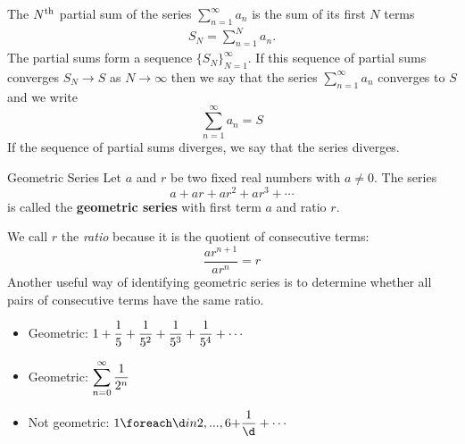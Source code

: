 \begin{frame}[t]
\begin{defn}
The $N^{\rm th}$ partial sum of the series $\sum_{n=1}^\infty a_n$ is the sum of its first $N$ terms
\begin{align*}
S_N=\sum_{n=1}^N a_n.
\end{align*}
The partial sums form a sequence $\big\{S_N\big\}_{N=1}^\infty$.
If this sequence of partial sums converges $S_N \to S$ as
$N\rightarrow\infty$  then we say that the series $\sum_{n=1}^\infty a_n$
converges to $S$ and we write
\begin{equation*}
\sum_{n=1}^\infty a_n=S
\end{equation*}
If the sequence of partial sums diverges, we say that the series diverges.
\end{defn}
\end{frame}
\begin{frame}[t]
\begin{block}{Geometric Series}
Let $a$ and $r$ be two fixed real numbers with $a \neq 0$. The series 
\[a+ar+ar^2+ar^3+\cdots\]
is called the \textbf{geometric series} with first term $a$ and ratio $r$.
\end{block}
We call $r$ the \textit{ratio} because it is the quotient of consecutive terms:
\[\frac{ar^{n+1}}{ar^n}=r\]\pause
Another useful way of identifying geometric series is to determine whether all pairs of consecutive terms have the same ratio.

\begin{itemize}
\item  Geometric: $\displaystyle 1+\frac15+\frac{1}{5^2}+\frac{1}{5^3}+\frac{1}{5^4}+\cdots$
\item Geometric: $\displaystyle\sum_{n=0}^\infty \frac{1}{2^n}$
\item Not geometric: $\ds 1 \foreach \d in {2,...,6}{+ \frac1\d}+\cdots$
\end{itemize}
\end{frame}

